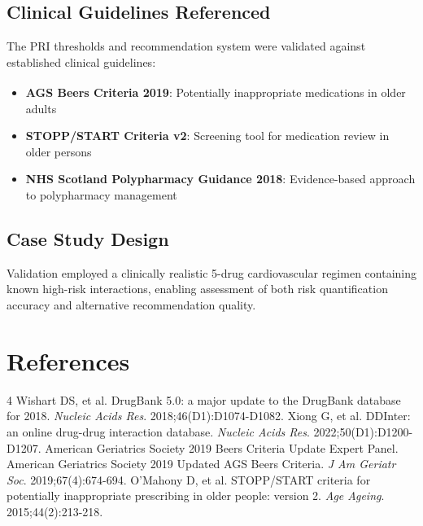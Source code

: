 \documentclass[11pt,a4paper]{article}
\begin{document}
\subsection{Clinical Guidelines Referenced}

The PRI thresholds and recommendation system were validated against established clinical guidelines:

\begin{itemize}
    \item \textbf{AGS Beers Criteria\textsuperscript{\textregistered} 2019}: Potentially inappropriate medications in older adults
    \item \textbf{STOPP/START Criteria v2}: Screening tool for medication review in older persons
    \item \textbf{NHS Scotland Polypharmacy Guidance 2018}: Evidence-based approach to polypharmacy management
\end{itemize}

\subsection{Case Study Design}

Validation employed a clinically realistic 5-drug cardiovascular regimen containing known high-risk interactions, enabling assessment of both risk quantification accuracy and alternative recommendation quality.

\section*{References}


\begin{thebibliography}{4}
 Wishart DS, et al. DrugBank 5.0: a major update to the DrugBank database for 2018. \textit{Nucleic Acids Res}. 2018;46(D1):D1074-D1082.
 Xiong G, et al. DDInter: an online drug-drug interaction database. \textit{Nucleic Acids Res}. 2022;50(D1):D1200-D1207.
 American Geriatrics Society 2019 Beers Criteria Update Expert Panel. American Geriatrics Society 2019 Updated AGS Beers Criteria. \textit{J Am Geriatr Soc}. 2019;67(4):674-694.
 O'Mahony D, et al. STOPP/START criteria for potentially inappropriate prescribing in older people: version 2. \textit{Age Ageing}. 2015;44(2):213-218.
\end{thebibliography}
\end{document}
